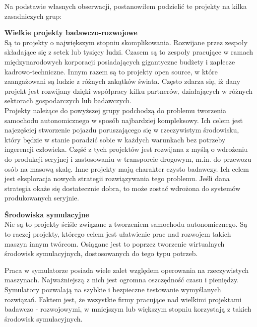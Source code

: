 Na podstawie własnych obserwacji, postanowiłem podzielić te projekty na kilka zasadniczych grup:

\begin{enumerate*}
\item \textbf{Wielkie projekty badawczo-rozwojowe} \\
Są to projekty o największym stopniu skomplikowania. Rozwijane przez zespoły składające się z setek lub tysięcy ludzi. Czasem są to zespoły pracujące w ramach międzynarodowych korporacji posiadających gigantyczne budżety i zaplecze kadrowo-techniczne. Innym razem są to projekty open source, w które zaangażowani są ludzie z różnych zakątków świata. Często zdarza się, iż dany projekt jest rozwijany dzięki współpracy kilku partnerów, działających w różnych sektorach gospodarczych lub badawczych. \\
Projekty należące do powyższej grupy podchodzą do problemu tworzenia samochodu autonomicznego w sposób najbardziej kompleksowy. Ich celem jest najczęściej stworzenie pojazdu poruszającego się w rzeczywistym środowisku, który będzie w stanie poradzić sobie w każdych warunkach bez potrzeby ingerencji człowieka.
Część z tych projektów jest rozwijana z myślą o wdrożeniu do produkcji seryjnej i zastosowaniu w transporcie drogowym, m.in. do przewozu osób na masową skalę.
Inne projekty mają charakter czysto badawczy. Ich celem jest eksploracja nowych strategii rozwiązywania tego problemu. Jeśli dana strategia okaże się dostatecznie dobra, to może zostać wdrożona do systemów produkowanych seryjnie. \\

\item \textbf{Środowiska symulacyjne} \\
Nie są to projekty ściśle związane z tworzeniem samochodu autonomicznego. Są to raczej projekty, którego celem jest ułatwienie prac nad rozwojem takich maszyn innym twórcom. Osiągane jest to poprzez tworzenie wirtualnych środowisk symulacyjnych, dostosowanych do tego typu potrzeb. 

Praca w symulatorze posiada wiele zalet względem operowania na rzeczywistych maszynach. Najważniejszą z nich jest ogromna oszczędność czasu i pieniędzy. Symulatory pozwalają na szybkie i bezpieczne testowanie wymyślanych rozwiązań. \linebreak
Faktem jest, że wszystkie firmy pracujące nad wielkimi projektami badawczo - rozwojowymi, w mniejszym lub większym stopniu korzystają z takich środowisk symulacyjnych. \\


\end{enumerate*}
